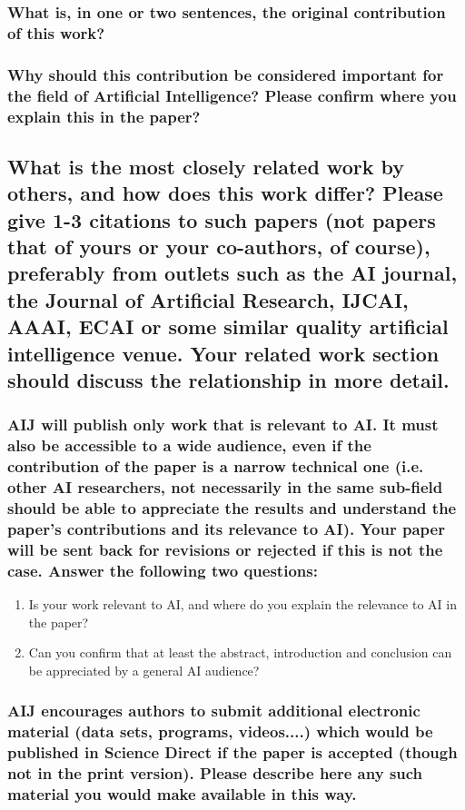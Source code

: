 \documentclass{article}
\begin{document}
\subsubsection*{What is, in one or two sentences, the original contribution of this work?}


\subsubsection*{Why should this contribution be considered important for the field of Artificial Intelligence? Please confirm where you explain this in the paper?}

\subsection*{What is the most closely related work by others, and how does this work differ? Please give 1-3 citations to such papers (not papers that of yours or your co-authors, of course), preferably from outlets such as the AI journal, the Journal of Artificial Research, IJCAI, AAAI, ECAI or some similar quality artificial intelligence venue. Your related work section should discuss the relationship in more detail.}


\subsubsection*{AIJ will publish only work that is relevant to AI. It must also be accessible to a wide audience, even if the contribution of the paper is a narrow technical one (i.e. other AI researchers, not necessarily in the same sub-field should be able to appreciate the results and understand the paper's contributions and its relevance to AI). Your paper will be sent back for revisions or rejected if this is not the case. Answer the following two questions:}

\begin{enumerate}
    \item Is your work relevant to AI, and where do you explain the relevance to AI in the paper?
    \item Can you confirm that at least the abstract, introduction and conclusion can be appreciated by a general AI audience?
\end{enumerate}


\subsubsection*{AIJ encourages authors to submit additional electronic material (data sets, programs, videos....) which would be published in Science Direct if the paper is accepted (though not in the print version). Please describe here any such material you would make available in this way.}
\end{document}
